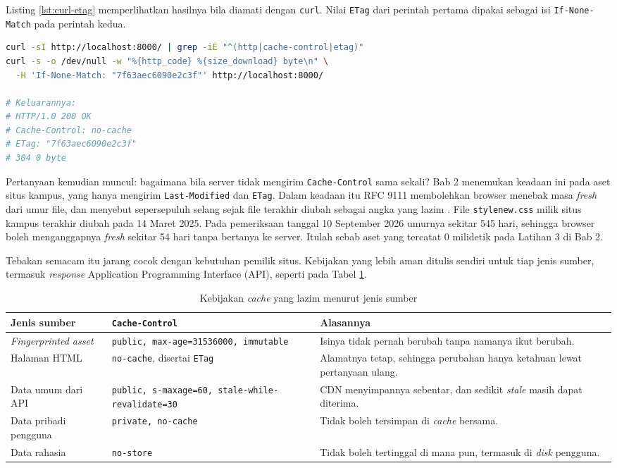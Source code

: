 Listing \ref{lst:curl-etag} memperlihatkan hasilnya bila diamati dengan
\texttt{curl}. Nilai \texttt{ETag} dari perintah pertama dipakai sebagai isi
\texttt{If-None-Match} pada perintah kedua.

\begin{lstlisting}[language=bash, caption={Validasi ulang halaman memakai \texttt{ETag}}, label={lst:curl-etag}]
curl -sI http://localhost:8000/ | grep -iE "^(http|cache-control|etag)"
curl -s -o /dev/null -w "%{http_code} %{size_download} byte\n" \
  -H 'If-None-Match: "7f63aec6090e2c3f"' http://localhost:8000/

# Keluarannya:
# HTTP/1.0 200 OK
# Cache-Control: no-cache
# ETag: "7f63aec6090e2c3f"
# 304 0 byte
\end{lstlisting}

Pertanyaan kemudian muncul: bagaimana bila server tidak mengirim
\texttt{Cache-Control} sama sekali? Bab 2 menemukan keadaan ini pada aset situs
kampus, yang hanya mengirim \texttt{Last-Modified} dan \texttt{ETag}. Dalam
keadaan itu RFC 9111 membolehkan browser menebak masa \textit{fresh} dari umur file,
dan menyebut sepersepuluh selang sejak file terakhir diubah sebagai angka
yang lazim \cite{rfc9111}. File \texttt{stylenew.css} milik situs kampus
terakhir diubah pada 14 Maret 2025. Pada pemeriksaan tanggal 10 September 2026
umurnya sekitar 545 hari, sehingga browser boleh menganggapnya \textit{fresh} sekitar
54 hari tanpa bertanya ke server. Itulah sebab aset yang tercatat 0 milidetik
pada Latihan 3 di Bab 2.

Tebakan semacam itu jarang cocok dengan kebutuhan pemilik situs. Kebijakan
yang lebih aman ditulis sendiri untuk tiap jenis sumber, termasuk \textit{response}
Application Programming Interface (API), seperti pada Tabel
\ref{tab:kebijakan-sumber}.

\begin{table}[!htb]
  \centering
  \caption{Kebijakan \textit{cache} yang lazim menurut jenis sumber}
  \label{tab:kebijakan-sumber}
  \begin{tabularx}{\textwidth}{lXX}
    \hline
    \textbf{Jenis sumber} & \textbf{\texttt{Cache-Control}} & \textbf{Alasannya} \\
    \hline
    \textit{Fingerprinted asset} & \texttt{public, max-age=31536000, immutable} & Isinya tidak pernah berubah tanpa namanya ikut berubah. \\
    \hline
    Halaman HTML & \texttt{no-cache}, disertai \texttt{ETag} & Alamatnya tetap, sehingga perubahan hanya ketahuan lewat pertanyaan ulang. \\
    \hline
    Data umum dari API & \texttt{public, s-maxage=60, stale-while-revalidate=30} & CDN menyimpannya sebentar, dan sedikit \textit{stale} masih dapat diterima. \\
    \hline
    Data pribadi pengguna & \texttt{private, no-cache} & Tidak boleh tersimpan di \textit{cache} bersama. \\
    \hline
    Data rahasia & \texttt{no-store} & Tidak boleh tertinggal di mana pun, termasuk di \textit{disk} pengguna. \\
    \hline
  \end{tabularx}
\end{table}

